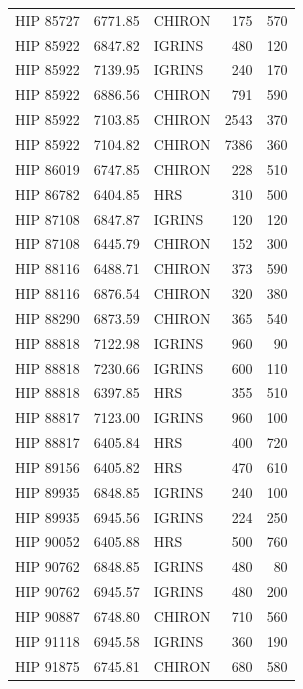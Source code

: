 {\begin{scriptsize}
\begin{longtable}{|l|rlrr|}
   HIP 85727 &  6771.85 &     CHIRON &      175 &   570 \\
   HIP 85922 &  6847.82 &     IGRINS &      480 &   120 \\
   HIP 85922 &  7139.95 &     IGRINS &      240 &   170 \\
   HIP 85922 &  6886.56 &     CHIRON &      791 &   590 \\
   HIP 85922 &  7103.85 &     CHIRON &     2543 &   370 \\
   HIP 85922 &  7104.82 &     CHIRON &     7386 &   360 \\
   HIP 86019 &  6747.85 &     CHIRON &      228 &   510 \\
   HIP 86782 &  6404.85 &        HRS &      310 &   500 \\
   HIP 87108 &  6847.87 &     IGRINS &      120 &   120 \\
   HIP 87108 &  6445.79 &     CHIRON &      152 &   300 \\
   HIP 88116 &  6488.71 &     CHIRON &      373 &   590 \\
   HIP 88116 &  6876.54 &     CHIRON &      320 &   380 \\
   HIP 88290 &  6873.59 &     CHIRON &      365 &   540 \\
   HIP 88818 &  7122.98 &     IGRINS &      960 &    90 \\
   HIP 88818 &  7230.66 &     IGRINS &      600 &   110 \\
   HIP 88818 &  6397.85 &        HRS &      355 &   510 \\
   HIP 88817 &  7123.00 &     IGRINS &      960 &   100 \\
   HIP 88817 &  6405.84 &        HRS &      400 &   720 \\
   HIP 89156 &  6405.82 &        HRS &      470 &   610 \\
   HIP 89935 &  6848.85 &     IGRINS &      240 &   100 \\
   HIP 89935 &  6945.56 &     IGRINS &      224 &   250 \\
   HIP 90052 &  6405.88 &        HRS &      500 &   760 \\
   HIP 90762 &  6848.85 &     IGRINS &      480 &    80 \\
   HIP 90762 &  6945.57 &     IGRINS &      480 &   200 \\
   HIP 90887 &  6748.80 &     CHIRON &      710 &   560 \\
   HIP 91118 &  6945.58 &     IGRINS &      360 &   190 \\
   HIP 91875 &  6745.81 &     CHIRON &      680 &   580 \\

\end{longtable}
\end{scriptsize}}
